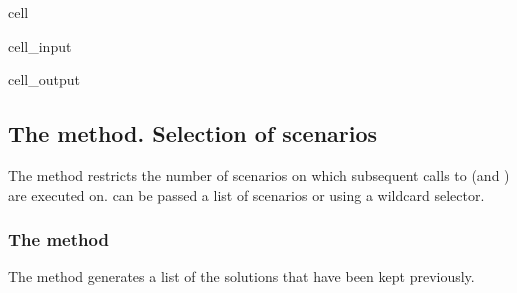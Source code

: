 \documentclass[letterpaper,10pt,english]{jupyterBook}
\begin{document}
\begin{sphinxuseclass}{cell}\begin{sphinxVerbatimInput}

\begin{sphinxuseclass}{cell_input}
\begin{sphinxVerbatim}[commandchars=\\\{\}]
  
\end{sphinxVerbatim}

\end{sphinxuseclass}\end{sphinxVerbatimInput}
\begin{sphinxVerbatimOutput}

\begin{sphinxuseclass}{cell_output}
\noindent{}

\noindent{}

\end{sphinxuseclass}\end{sphinxVerbatimOutput}

\end{sphinxuseclass}

\subsection{The  method. Selection of scenarios}
\label{\detokenize{content/05_WBModels/ScenarioAnalysis:the-keep-switch-method-selection-of-scenarios}}
\sphinxAtStartPar
The  method restricts the number of scenarios on which subsequent calls to  (and ) are executed on.   can be passed a list of scenarios or using a wildcard selector.


\subsubsection{The  method}
\label{\detokenize{content/05_WBModels/ScenarioAnalysis:the-keep-solutions-keys-method}}
\sphinxAtStartPar
The  method generates a list of the solutions that have been kept previously.
\end{document}
